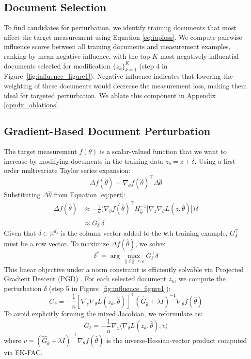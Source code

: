\documentclass{article} %
\begin{document}
\subsection{Document Selection}
To find candidates for perturbation, we identify training documents that most affect the target measurement using Equation \ref{eq:iuploss}. We compute pairwise influence scores between all training documents and measurement examples, ranking by mean negative influence, with the top $K$ most negatively influential documents selected for modification $\{z_k\}_{k=1}^K$ (step 4 in Figure~\ref{fig:influence_figure1}). Negative influence indicates that lowering the weighting of these documents would decrease the measurement loss, making them ideal for targeted perturbation. We ablate this component in Appendix \ref{apndx_ablations}.

\subsection{Gradient-Based Document Perturbation}
The target measurement $f(\theta)$ is a scalar-valued function that we want to increase by modifying documents in the training data $z_\delta = z + \delta$. Using a first-order multivariate Taylor series expansion:
\begin{equation}
\Delta f(\hat\theta) = \nabla_\theta f( \hat\theta )^\top \Delta\hat\theta
\end{equation}
Substituting $\Delta\hat\theta$ from Equation \ref{eq:pert}:
\begin{align}
\Delta f(\hat\theta) &\approx -\frac{1}{n} \Big( \nabla_\theta f( \hat\theta )^\top H_{\hat{\theta}}^{-1} \big[ \nabla_z \nabla_\theta L(z, \hat\theta)\big]\Big)\delta\\
&\approx G_\delta^\top \delta
\end{align}
Given that $\delta \in \mathbb{R}^{d_z}$ is the column vector added to the $k$th training example, $G_\delta^\top$ must be a row vector. To maximize $\Delta f(\hat\theta)$, we solve:
\begin{equation}
\delta^* = \arg\max_{\|\delta\| \leq \epsilon} G_\delta^\top \delta
\end{equation}
This linear objective under a norm constraint is efficiently solvable via Projected Gradient Descent (PGD) \citep{madry2017towards}. For each selected document $z_k$, we compute the perturbation $\delta$ (step 5 in Figure~\ref{fig:influence_figure1}):
\begin{equation}
G_\delta = -\frac{1}{n} [\nabla_z \nabla_\theta L(z_k, \hat{\theta})]^\top (\hat{G}_{\hat{\theta}} + \lambda I)^{-1} \nabla_\theta f(\hat{\theta})
\end{equation}
To avoid explicitly forming the mixed Jacobian, we reformulate as:
\begin{equation}
G_\delta = -\frac{1}{n} \nabla_z \langle \nabla_\theta L(z_k, \hat{\theta}), v \rangle
\end{equation}
where $v = (\hat{G}_{\hat{\theta}} + \lambda I)^{-1} \nabla_\theta f(\hat{\theta})$ is the inverse-Hessian-vector product computed via EK-FAC.
\end{document}
